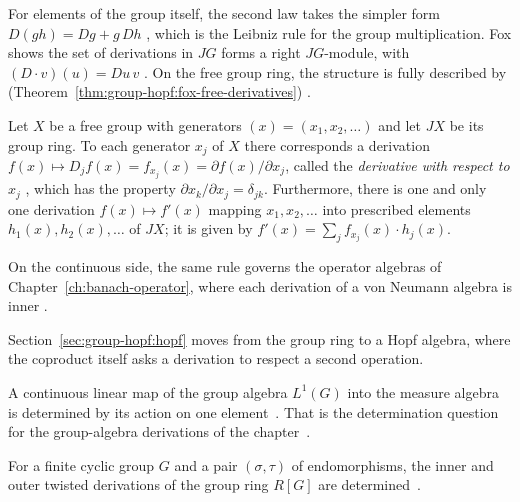 For elements of the group itself, the second law takes the simpler form
$D(gh)=Dg+g\,Dh$ \cite[(1.2)', p.~549]{Fox1953}, which is the Leibniz rule for
the group multiplication. Fox shows the set of derivations in $JG$ forms a
right $JG$-module, with $(D\cdot v)(u)=Du\,v$ \cite[p.~549]{Fox1953}. On the
free group ring, the structure is fully described by
(Theorem~\ref{thm:group-hopf:fox-free-derivatives}) \cite[Theorem, equations
(2.1) and (2.2), p.~550]{Fox1953}.

\begin{theorem}\label{thm:group-hopf:fox-free-derivatives}
Let $X$ be a free group with generators $(x)=(x_1,x_2,\dots)$ and let $JX$ be
its group ring. To each generator $x_j$ of $X$ there corresponds a derivation
$f(x)\mapsto D_j f(x)=f_{x_j}(x)=\partial f(x)/\partial x_j$, called the
\emph{derivative with respect to} $x_j$ \cite[p.~550]{Fox1953}, which has the property
$\partial x_k/\partial x_j=\delta_{jk}$. Furthermore, there is one and only one
derivation $f(x)\mapsto f'(x)$ mapping $x_1,x_2,\ldots$ into prescribed
elements $h_1(x),h_2(x),\ldots$ of $JX$; it is given by
$f'(x)=\sum_j f_{x_j}(x)\cdot h_j(x)$.
\end{theorem}

On the continuous side, the same rule governs the operator algebras of
Chapter~\ref{ch:banach-operator}, where each derivation of a von Neumann
algebra is inner \cite[Theorem~15, p.~290]{Kadison1966}.

Section~\ref{sec:group-hopf:hopf} moves from the group ring to a Hopf algebra,
where the coproduct itself asks a derivation to respect a second operation.

A continuous linear map of the group algebra $L^1(G)$ into the measure algebra
is determined by its action on one element~\cite{WlLinearMapsOnGroupAlgebrasDeter2019}. That is the determination
question for the group-algebra derivations of the
chapter~\cite{WlLinearMapsOnGroupAlgebrasDeter2019}.

For a finite cyclic group $G$ and a pair $(\sigma,\tau)$ of endomorphisms, the
inner and outer twisted derivations of the group ring $R[G]$ are
determined~\cite{WlInnerAndOuterTwistedDerivation2019}.
